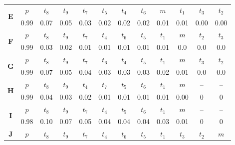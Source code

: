 {{\begin{table}[!ht]
\begin{tabular}{|c|c|c|c|c|c|c|c|c|c|c|c|}
        \hline
        \multirow{2}{*}{\textbf{E}} & $p$ & \cellcolor[gray]{0.45} $t_8$ & \cellcolor[gray]{0.50} $t_9$ &  \cellcolor[gray]{0.65} $t_7$ & \cellcolor[gray]{0.70} $t_5$ & \cellcolor[gray]{0.60} $t_4$ & \cellcolor[gray]{0.75} $t_6$ & $m$ & \cellcolor[gray]{0.40} $t_1$ & \cellcolor[gray]{0.80} $t_3$ & \cellcolor[gray]{0.55} $t_2$ \\
        & 0.99 & 0.07 & 0.05 & 0.03 & 0.02 & 0.02 & 0.02 & 0.01 & 0.01 & 0.00 & 0.00 \\ 
        \hline
        \multirow{2}{*}{\textbf{F}} & $p$ & \cellcolor[gray]{0.45} $t_8$ & \cellcolor[gray]{0.50} $t_9$ &  \cellcolor[gray]{0.65} $t_7$ & \cellcolor[gray]{0.60} $t_4$ & \cellcolor[gray]{0.75} $t_6$ & \cellcolor[gray]{0.70} $t_5$ & \cellcolor[gray]{0.40} $t_1$ & $m$ & \cellcolor[gray]{0.55} $t_2$ & \cellcolor[gray]{0.80} $t_3$ \\
        & 0.99 & 0.03 & 0.02 & 0.01 & 0.01 & 0.01 & 0.01 & 0.01 & 0.0 & 0.0 & 0.0 \\ 
        \hline
        \multirow{2}{*}{\textbf{G}} & $p$ & \cellcolor[gray]{0.45} $t_8$ & \cellcolor[gray]{0.50} $t_9$ & \cellcolor[gray]{0.65} $t_7$ & \cellcolor[gray]{0.75} $t_6$ & \cellcolor[gray]{0.60} $t_4$ & \cellcolor[gray]{0.70} $t_5$ & \cellcolor[gray]{0.40} $t_1$ & $m$ & \cellcolor[gray]{0.80} $t_3$ & \cellcolor[gray]{0.55} $t_2$ \\
        & 0.99 & 0.07 & 0.05 & 0.04 & 0.03 & 0.03 & 0.03 & 0.02 & 0.01 & 0.0 & 0.0 \\ 
        \hline
        \multirow{2}{*}{\textbf{H}} & $p$ & \cellcolor[gray]{0.45} $t_8$ & \cellcolor[gray]{0.50} $t_9$ & \cellcolor[gray]{0.60} $t_4$ &\cellcolor[gray]{0.65} $t_7$ &\cellcolor[gray]{0.70} $t_5$ &\cellcolor[gray]{0.75} $t_6$ &\cellcolor[gray]{0.40} $t_1$ & $m$ & -- & -- \\
        & 0.99 & 0.04 & 0.03 & 0.02 & 0.01 & 0.01 & 0.01 & 0.01 & 0.00 & 0 & 0 \\ 
        \hline
        \multirow{2}{*}{\textbf{I}} & $p$ &\cellcolor[gray]{0.45} $t_8$ & \cellcolor[gray]{0.50} $t_9$ & \cellcolor[gray]{0.65} $t_7$ &\cellcolor[gray]{0.60} $t_4$ &\cellcolor[gray]{0.70} $t_5$ &\cellcolor[gray]{0.75} $t_6$ &\cellcolor[gray]{0.40} $t_1$ & $m$ & -- & -- \\
        & 0.98 & 0.10 & 0.07 & 0.05 & 0.04 & 0.04 & 0.04 & 0.03 & 0.01 & 0 & 0 \\ 
        \hline
        \multirow{2}{*}{\textbf{J}} & $p$ &\cellcolor[gray]{0.45} $t_8$ &\cellcolor[gray]{0.50} $t_9$ & \cellcolor[gray]{0.65} $t_7$ & \cellcolor[gray]{0.60} $t_4$ &\cellcolor[gray]{0.75} $t_6$ &\cellcolor[gray]{0.70} $t_5$ &\cellcolor[gray]{0.40} $t_1$ &\cellcolor[gray]{0.80} $t_3$ &\cellcolor[gray]{0.55} $t_2$ & $m$ \\

\end{tabular}
\end{table}}}
